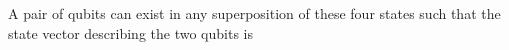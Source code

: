 \documentclass[preview]{standalone}
\begin{document}
\begin{center}
A pair of qubits can exist in any superposition of these four states such that the state vector describing the two qubits is
\end{center}
\end{document}
